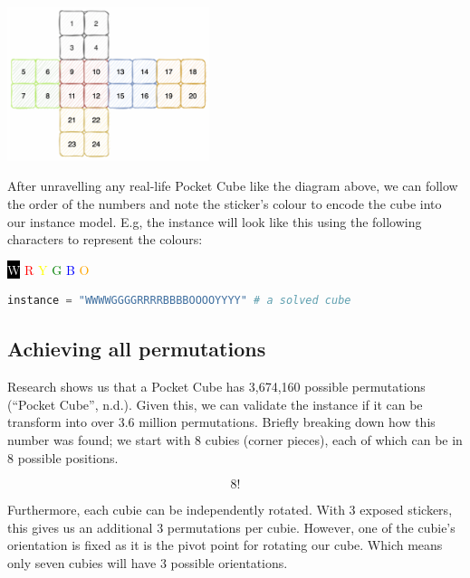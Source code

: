 \documentclass[a4paper]{article}
\begin{document}
\begin{center}
\includegraphics[width=5.9cm]{encoded.png}
\end{center}

\newpage

\par After unravelling any real-life Pocket Cube like the diagram above, we can follow the order of the numbers and note the sticker’s colour to encode the cube into our instance model. E.g, the instance will look like this using the following characters to represent the colours:

\begin{center}
\colorbox{black}{\textcolor{white}{W}}
\textcolor{red}{R}
\textcolor{yellow}{Y}
\textcolor{green}{G}
\textcolor{blue}{B}
\textcolor{orange}{O}
\end{center}

\begin{lstlisting}[language=Python]
instance = "WWWWGGGGRRRRBBBBOOOOYYYY" # a solved cube
\end{lstlisting}

\subsection{Achieving all permutations}
\label{permutations}

\par Research shows us that a Pocket Cube has 3,674,160 possible permutations (“Pocket Cube”, n.d.). Given this, we can validate the instance if it can be transform into over 3.6 million permutations. Briefly breaking down how this number was found; we start with 8 cubies (corner pieces), each of which can be in 8 possible positions.

\[8!\]

\par Furthermore, each cubie can be independently rotated. With 3 exposed stickers, this gives us an additional 3 permutations per cubie. However, one of the cubie's orientation is fixed as it is the pivot point for rotating our cube. Which means only seven cubies will have 3 possible orientations.
\end{document}
